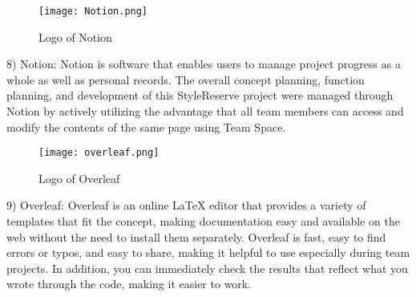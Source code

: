 \documentclass[conference]{IEEEtran}
\begin{document}
\begin{figure}[htbp]
\centerline{\texttt{[image: Notion.png]}}
\label{fig}
\caption{Logo of Notion}
\end{figure}
8) Notion: Notion is software that enables users to manage project progress as a whole as well as personal records. The overall concept planning, function planning, and development of this StyleReserve project were managed through Notion by actively utilizing the advantage that all team members can access and modify the contents of the same page using Team Space.\\

\begin{figure}[htbp]
\centerline{\texttt{[image: overleaf.png]}}
\label{fig}
\caption{Logo of Overleaf}
\end{figure}
9) Overleaf: Overleaf is an online LaTeX editor that provides a variety of templates that fit the concept, making documentation easy and available on the web without the need to install them separately. Overleaf is fast, easy to find errors or typos, and easy to share, making it helpful to use especially during team projects. In addition, you can immediately check the results that reflect what you wrote through the code, making it easier to work.\\
\end{document}
